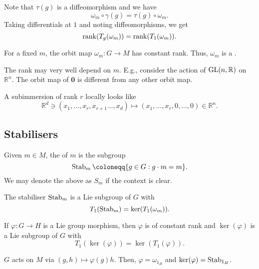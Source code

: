 \documentclass[12pt]{article}
\begin{document}
Note that $\tau(g)$ is a diffeomorphism and we have
\begin{equation*} 
	\omega_{m} \circ \gamma(g) = \tau(g) \circ \omega_{m}.
\end{equation*}
Taking differentials at $1$ and noting diffeomorphisms, we get
\begin{equation*} 
	\operatorname{rank}(T_{g}(\omega_{m})) = \operatorname{rank}(T_{1}(\omega_{m})).
\end{equation*}

\begin{cor}
	For a fixed $m$, the orbit map $\omega_{m} \colon G \to M$ has constant rank. \newline
	Thus, $\omega_{m}$ is a .
\end{cor}
The rank may very well depend on $m$. 
E.g., consider the action of $\operatorname{GL}(n, \mathbb{R})$ on $\mathbb{R}^{n}$. 
The orbit map of $\mathbf{0}$ is different from any other orbit map.

A subimmersion of rank $r$ locally looks like 
\begin{equation*} 
	\mathbb{R}^{d} \ni (x_{1}, \ldots, x_{r}, x_{r + 1} \ldots, x_{d}) \mapsto (x_{1}, \ldots, x_{r}, 0, \ldots, 0) \in \mathbb{R}^{n}.
\end{equation*}

\subsection{Stabilisers}

Given $m \in M$, the  of $m$ is the subgroup
\begin{equation*} 
	\Stab_{m} \coloneqq \{g \in G : g \cdot m = m\}.
\end{equation*}
We may denote the above as $S_{m}$ if the context is clear.

\begin{thm} \label{thm:stabiliser-subgroup-tangent-space}
	The stabiliser $\operatorname{Stab}_{m}$ is a Lie subgroup of $G$ with
	\begin{equation*} 
		T_{1}(\operatorname{Stab}_{m}) = \ker(T_{1}(\omega_{m})).
	\end{equation*}
\end{thm}

\begin{cor} \label{cor:image-kernel-morphism-properties}
	If $\varphi \colon G \to H$ is a Lie group morphism, then $\varphi$ is of constant rank and $\ker(\varphi)$ is a Lie subgroup of $G$ with 
	\begin{equation*} 
		T_{1}(\ker(\varphi)) = \ker(T_{1}(\varphi)).
	\end{equation*}
\end{cor}
\begin{sketch} 
	$G$ acts on $M$ via $(g, h) \mapsto \varphi(g) h$. Then, $\varphi = \omega_{1_{H}}$ and $\ker(\varphi) = \operatorname{Stab}_{1_{H}}$.
\end{sketch}
\end{document}
